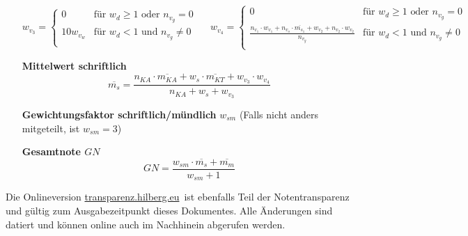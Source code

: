 \documentclass{article}
\newcommand{\onlinedoc}{\href{https://transparenz.hilberg.eu}{transparenz.hilberg.eu}}
\begin{document}
\begin{enumerate}[label=\textbf{\textbullet}, align=left, leftmargin=*]
	\[
	w_{v_3} =
	\begin{cases}
		0 & \text{für }  w_{d} \geq 1 \text{ oder } n_{v_g}=0 \\
		10 w_{v_w} & \text{für }    w_{d} < 1 \text{ und } n_{v_g} \neq 0 \\
	\end{cases}
	\,\,\,\,\,\,\,\,
	w_{v_4} =
	\begin{cases}
		0 & \text{für }  w_{d} \geq 1 \text{ oder } n_{v_g}=0 \\
		\frac{n_{v_1} \cdot w_{v_1} + n_{v_o} \cdot \overline{m_{s_1}} + w_{v_2} + n_{v_2} \cdot w_{v_2}}{n_{v_g}} & \text{für }    w_{d} < 1 \text{ und } n_{v_g} \neq 0 \\
	\end{cases}
	\]	
	\item[\textbf{Mittelwert schriftlich}]
	\[
	\overline{m_{s}} = \frac{ n_{KA} \cdot \overline{m_{KA}} + w_s \cdot \overline{m_{KT}} +w_{v_3} \cdot w_{v_4}   }{n_{KA} + w_s + w_{v_3}}
	\]
	\item[\textbf{Gewichtungsfaktor schriftlich/mündlich}] $w_{sm}$ (Falls nicht anders mitgeteilt, ist $w_{sm}=3$)
	\item[\textbf{Gesamtnote $GN$}]
	\[
	GN = \frac{w_{sm} \cdot \overline{m_{s}} + \overline{m_{m}}}{w_{sm}+1}
	\]
\end{enumerate}

\renewcommand\refname{\footnotesize Mathematische Notationen}
\renewcommand{\bibname}{Quellen}

\vfill

\begingroup
\tiny


\endgroup

{\tiny Die Onlineversion \onlinedoc \, ist ebenfalls Teil der Notentransparenz und gültig zum Ausgabezeitpunkt dieses Dokumentes. Alle Änderungen sind datiert und können online auch im Nachhinein abgerufen werden.}
\end{document}
